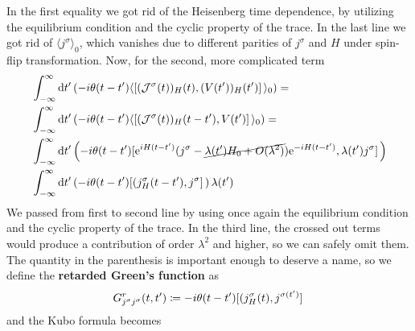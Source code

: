 In the first equality we got rid of the Heisenberg time dependence, by utilizing the equilibrium
condition and the cyclic property of the trace. In the last line we got rid of \(\langle j^{\sigma } \rangle_0\),
which vanishes due to different parities of \(j^{\sigma }\) and \(H\) under spin-flip transformation.
Now, for the second, more complicated term
\begin{align}
     & \int_{-\infty}^{\infty } \mathrm{d} t^{\prime} \left(-i \theta (t-t^{\prime} ) \langle \comm*{(\mathcal{J}^{\sigma }(t))_{H}(t) }
    {(V(t^{\prime} ))_{H}(t^{\prime} )} \rangle_0 \right) = \nonumber                                                                                                                                                              \\
     & \int_{-\infty}^{\infty } \mathrm{d} t^{\prime} \left(-i \theta (t-t^{\prime} ) \langle \comm*{(\mathcal{J}^{\sigma }(t))_{H}(t-t^{\prime} ) }
    {V(t^{\prime} )} \rangle_0 \right) = \nonumber                                                                                                                                                                                 \\
     & \int_{-\infty}^{\infty } \mathrm{d} t^{\prime} \left( -i \theta (t-t^{\prime} ) \comm*{\mathrm{e}^{i H(t-t^{\prime} )} (j^{\sigma } -  \cancel{\lambda (t^{\prime} )H_0 + O(\lambda ^2)}) \mathrm{e}^{-i H(t-t^{\prime} )}}
    {\lambda (t^{\prime} ) j^{\sigma }} \right) \nonumber                                                                                                                                                                          \\
     & \int_{-\infty}^{\infty } \mathrm{d} t^{\prime} \left( -i \theta (t-t^{\prime} ) \comm*{(j^{\sigma }_{H}(t-t^{\prime} )} {j^{\sigma }} \right) \lambda (t^{\prime} )
\end{align}
We passed from first to second line by using once again the equilibrium condition and the cyclic property of the trace.
In the third line, the crossed out terms would produce a contribution of order \(\lambda ^2\) and higher, so we can safely
omit them. The quantity in the parenthesis is important enough to deserve a name, so we define
the \textbf{retarded Green's function} as
\begin{equation}
    G^r_{j^{\sigma }j^{\sigma}}(t,t^{\prime} ) \coloneqq -i \theta (t-t^{\prime} ) \comm*{(j^{\sigma }_{H}(t )} {j^{\sigma(t^{\prime} ) }}
\end{equation}
and the Kubo formula becomes
